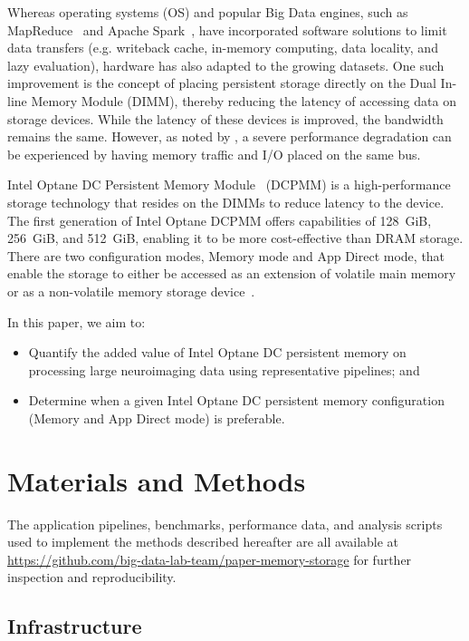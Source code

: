 Whereas operating systems (OS) and popular Big Data engines, such as
MapReduce~\cite{dean2008mapreduce} and Apache Spark~\cite{zaharia2016apache},
have incorporated software solutions to limit data transfers (e.g. writeback
cache, in-memory computing, data locality, and lazy evaluation), hardware has
also adapted to the growing datasets. One such improvement is the concept of
placing persistent storage directly on the Dual In-line Memory Module (DIMM),
thereby reducing the latency of accessing data on storage devices. While the
latency of these devices is improved, the bandwidth remains the same. However,
as noted by \cite{nvdimms}, a severe performance degradation can be experienced
by having memory traffic and I/O placed on the same bus.


Intel Optane DC Persistent Memory Module~\cite{optanebrief} (DCPMM) is a
high-performance storage technology that resides on the DIMMs to reduce latency
to the device. The first generation of Intel Optane DCPMM offers capabilities of
128~GiB, 256~GiB, and 512~GiB, enabling it to be more cost-effective than DRAM
storage. There are two configuration modes, Memory mode and App Direct mode,
that enable the storage to either be accessed as an extension of volatile main
memory or as a non-volatile memory storage device~\cite{memory-modes}.


In this paper, we aim to:
\begin{itemize}
        \item Quantify the added value of Intel Optane DC persistent memory on
            processing large neuroimaging data using representative pipelines;
            and
        \item Determine when a given Intel Optane DC persistent memory
            configuration (Memory and App Direct mode) is preferable.
\end{itemize}

\section{Materials and Methods}
The application pipelines, benchmarks, performance data, and analysis scripts
used to implement the methods described hereafter are all available at
\url{https://github.com/big-data-lab-team/paper-memory-storage} for further
inspection and reproducibility.

\subsection{Infrastructure}

